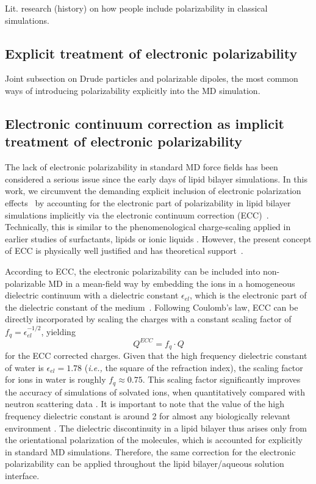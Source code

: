   Lit. research (history) on how people include polarizability in classical simulations. 

\subsection{Explicit treatment of electronic polarizability}

 Joint subsection on Drude particles and polarizable dipoles, the most common ways of introducing polarizability explicitly into the MD simulation. 

\subsection{Electronic continuum correction as implicit treatment of electronic polarizability}

The lack of electronic polarizability in standard MD force fields has been considered a serious issue since the early days of lipid bilayer simulations. In this work, we circumvent the demanding explicit inclusion of electronic polarization effects~\citep{lucas12, chowdhary13} by accounting for the electronic part of polarizability in lipid bilayer simulations implicitly via the electronic continuum correction (ECC)~\citep{leontyev11}. Technically, this is similar to the phenomenological charge-scaling applied in earlier studies of surfactants, lipids or ionic liquids \citep{jonsson86, egberts94, beichel14}. However, the present concept of ECC is physically well justified and has theoretical support~\citep{leontyev09, leontyev10, leontyev11, leontyev14}. 
 
According to ECC, the electronic polarizability can be included into non-polarizable MD in a mean-field way by  
embedding the ions in a homogeneous dielectric continuum with a dielectric constant $\epsilon_{el}$, which is the electronic part of the dielectric constant of the medium~\citep{leontyev11}. Following Coulomb's law,  ECC can be directly incorporated by scaling the charges with a constant scaling factor of $f_q = \epsilon _{el} ^{-1/2}$, yielding 
\begin{equation} 
Q^{ECC} = f_q \cdot Q 
\end{equation} 
for the ECC corrected charges.  
Given that the  high frequency dielectric constant of water is $\epsilon _{el} = 1.78$ (\textit{i.e.,} the square of the refraction index), the scaling factor for ions in water is roughly $f_q \approx 0.75$. This scaling factor significantly improves the accuracy of simulations of solvated ions, when quantitatively compared with neutron scattering data \citep{kohagen14,kohagen16, Pluharova2014, martinek17}. 
It is important to note that the value of the 
high frequency dielectric constant  
is around 2 for almost any biologically relevant environment \citep{leontyev11}. 
The dielectric discontinuity in a lipid bilayer thus arises only 
from the orientational polarization of the molecules, which is accounted for explicitly in standard MD simulations.  
Therefore, the same correction for the electronic polarizability can be  
applied throughout the lipid bilayer/aqueous solution interface. 
 
